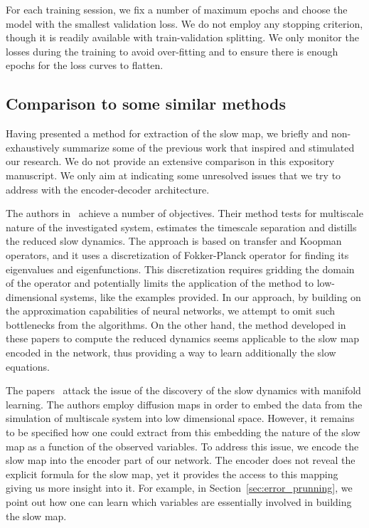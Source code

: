 \documentclass{article}
\begin{document}
For each training session, we fix a number of maximum epochs and choose the model with the smallest validation loss. We do not employ any stopping criterion, though it is readily available with train-validation splitting. We only monitor the losses during the training to avoid over-fitting and to ensure there is enough epochs for the loss curves to flatten.

\subsection{Comparison to some similar methods}
\label{sec:comparison}
Having presented a method for extraction of the slow map, we briefly and non-exhaustively summarize some of the previous work that inspired and stimulated our research. We do not provide an extensive comparison in this expository manuscript. We only aim at indicating some unresolved issues that we try to address with the encoder-decoder architecture.

The authors in~\cite{froyland_computational_2014,froyland_trajectory-free_2016} achieve a number of objectives. Their method tests for multiscale nature of the investigated system, estimates the timescale separation and distills the reduced slow dynamics. The approach is based on transfer and Koopman operators, and it uses a discretization of Fokker-Planck operator for finding its eigenvalues and eigenfunctions. This discretization requires gridding the domain of the operator and potentially limits the application of the method to low-dimensional systems, like the examples provided. In our approach, by building on the approximation capabilities of neural networks, we attempt to omit such bottlenecks from the algorithms. On the other hand, the method developed in these papers to compute the reduced dynamics seems applicable to the slow map encoded in the network, thus providing a way to learn additionally the slow equations.

The papers~\cite{singer_detecting_2009,dsilva_data-driven_2016} attack the issue of the discovery of the slow dynamics with manifold learning. The authors employ diffusion maps in order to embed the data from the simulation of multiscale system into low dimensional space. However, it remains to be specified how one could extract from this embedding the nature of the slow map as a function of the observed variables. To address this issue, we encode the slow map into the encoder part of our network. The encoder does not reveal the explicit formula for the slow map, yet it provides the access to this mapping giving us more insight into it. For example, in Section~\ref{sec:error_prunning}, we point out  how one can learn which variables are essentially involved in building the slow map.
\end{document}
